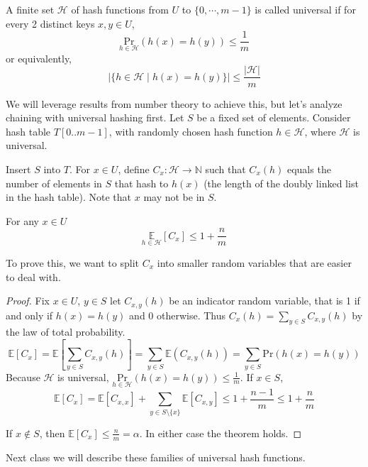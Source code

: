 \begin{definition}[Universal]
    A finite set $\mathcal{H}$ of hash functions from $U$ to $\{ 0, \cdots, m-1 \}$ is called universal if for every 2 distinct keys $x, y \in U$, \[  \underset{h \in \mathcal{H}}{\text{Pr}}(h(x) = h(y)) \leq \frac{1}{m} \] or equivalently, 
    \[
    |\{ h \in \mathcal{H} \mid h(x) = h(y) \}| \leq \frac{|\mathcal{H}|}{m}
    \]
\end{definition}

We will leverage results from number theory to achieve this, but let's analyze chaining with universal hashing first. Let $S$ be a fixed set of elements. Consider hash table $T[0..m-1]$, with randomly chosen hash function $h \in \mathcal{H}$, where $\mathcal{H}$ is universal.

Insert $S$ into $T$. For $x \in U$, define $C_x : \mathcal{H} \to \mathbb{N}$ such that $C_x(h)$ equals the number of elements in $S$ that hash to $h(x)$ (the length of the doubly linked list in the hash table). Note that $x$ may not be in $S$. 

\begin{simplethm}
For any $x \in U$
\[
    \underset{h \in \mathcal{H}}{\mathbb{E}}[C_x] \leq 1 + \frac{n}{m}
\]
\end{simplethm}

\noindent To prove this, we want to split $C_x$ into smaller random variables that are easier to deal with. 
\begin{proof}
    Fix $x \in U$, $y \in S$ let $C_{x, y}(h)$ be an indicator random variable, that is 1 if and only if $h(x) = h(y)$ and 0 otherwise. Thus $C_x(h) = \sum_{y \in S}C_{x, y}(h)$ by the law of total probability. 
    \[
    \mathbb{E}[C_x] = \mathbb{E}[\sum_{y \in S}C_{x, y}(h)] = \sum_{y \in S} \mathbb{E}(C_{x, y}(h)) = \sum_{y \in S} \text{Pr}(h(x) = h(y))
    \]
    Because $\mathcal{H}$ is universal, $\underset{h \in \mathcal{H}}{\text{Pr}}(h(x) = h(y)) \leq \frac{1}{m}$. If $x \in S$,
    \[
    \mathbb{E}[C_x] = \mathbb{E}[C_{x, x}] + \sum_{y \in S \setminus \{ x \}} \mathbb{E}[C_{x, y}] \leq 1 + \frac{n - 1}{m} \leq 1 + \frac{n}{m}
    \]

    \noindent If $x \not \in S$, then $\mathbb{E}[C_x] \leq \frac{n}{m} = \alpha$. In either case the theorem holds.
\end{proof}

Next class we will describe these families of universal hash functions.
